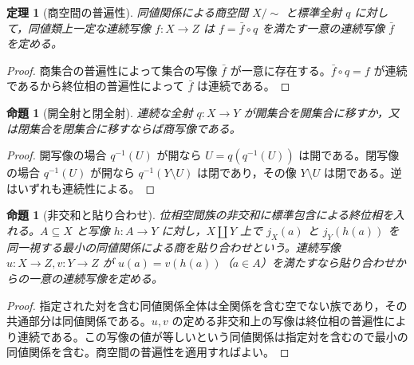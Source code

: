 \documentclass[a5paper,10pt,dvipdfmx]{jsarticle}
\theoremstyle{definition}
\theoremstyle{plain}
\newtheorem{prop}[ruledef]{命題}
\newtheorem{thm}[ruledef]{定理}
\begin{document}
\begin{thm}[商空間の普遍性]\label{k260}
同値関係による商空間 $X/{\sim}$ と標準全射 $q$ に対して，同値類上一定な連続写像 $f\colon X\to Z$ は $f=\bar f\circ q$ を満たす一意の連続写像 $\bar f$ を定める。
\end{thm}
\begin{proof}
商集合の普遍性によって集合の写像 $\bar f$ が一意に存在する。$\bar f\circ q=f$ が連続であるから終位相の普遍性によって $\bar f$ は連続である。
\end{proof}
\begin{prop}[開全射と閉全射]\label{k261}
連続な全射 $q\colon X\to Y$ が開集合を開集合に移すか，又は閉集合を閉集合に移すならば商写像である。
\end{prop}
\begin{proof}
開写像の場合 $q^{-1}(U)$ が開なら $U=q(q^{-1}(U))$ は開である。閉写像の場合 $q^{-1}(U)$ が開なら $q^{-1}(Y\setminus U)$ は閉であり，その像 $Y\setminus U$ は閉である。逆はいずれも連続性による。
\end{proof}
\begin{prop}[非交和と貼り合わせ]\label{k262}
位相空間族の非交和に標準包含による終位相を入れる。$A\subseteq X$ と写像 $h\colon A\to Y$ に対し，$X\amalg Y$ 上で $j_X(a)$ と $j_Y(h(a))$ を同一視する最小の同値関係による商を貼り合わせという。連続写像 $u\colon X\to Z,v\colon Y\to Z$ が $u(a)=v(h(a))$（$a\in A$）を満たすなら貼り合わせからの一意の連続写像を定める。
\end{prop}
\begin{proof}
指定された対を含む同値関係全体は全関係を含む空でない族であり，その共通部分は同値関係である。$u,v$ の定める非交和上の写像は終位相の普遍性により連続である。この写像の値が等しいという同値関係は指定対を含むので最小の同値関係を含む。商空間の普遍性を適用すればよい。
\end{proof}
\end{document}
